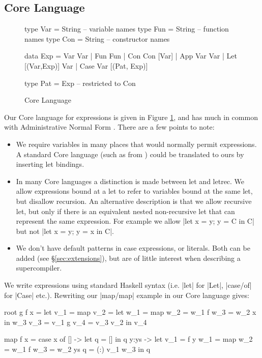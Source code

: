 \documentclass[draft]{sigplanconf}
\begin{document}
\subsection{Core Language}
\label{sec:core}

\begin{figure}
\begin{code}
type Var  = String -- variable names
type Fun  = String -- function names
type Con  = String -- constructor names

data Exp  =  Var Var
          |  Fun Fun
          |  Con Con [Var]
          |  App Var Var
          |  Let [(Var,Exp)] Var
          |  Case Var [(Pat, Exp)]

type Pat = Exp -- restricted to Con
\end{code}
\caption{Core Language}
\label{fig:core}
\end{figure}

Our Core language for expressions is given in Figure \ref{fig:core}, and has much in common with Administrative Normal Form \cite{flanagan:continuations}. There are a few points to note:

\begin{itemize}
\item We require variables in many places that would normally permit expressions. A standard Core language (such as from \citet{ghc_core}) could be translated to ours by inserting let bindings.
\item In many Core languages a distinction is made between let and letrec. We allow expressions bound at a let to refer to variables bound at the same let, but disallow recursion. An alternative description is that we allow recursive let, but only if there is an equivalent nested non-recursive let that can represent the same expression. For example we allow |let x = y; y = C in C| but not |let x = y; y = x in C|.
\item We don't have default patterns in case expressions, or literals. Both can be added (see \S\ref{sec:extensions}), but are of little interest when describing a supercompiler.
\end{itemize}

We write expressions using standard Haskell syntax (i.e. |let| for |Let|, |case/of| for |Case| etc.). Rewriting our |map/map| example in our Core language gives:

\begin{code}
root g f x =  let  v_1 =  map
                   v_2 =  let  w_1 = map
                               w_2 = w_1 f
                               w_3 = w_2 x
                          in   w_3
                   v_3 =  v_1 g
                   v_4 =  v_3 v_2
              in   v_4

map f x = case x of
    [] ->   let  q = []
            in   q
    y:ys -> let  v_1 = f y
                 w_1 = map
                 w_2 = w_1 f
                 w_3 = w_2 ys
                 q = (:) v_1 w_3
            in   q
\end{code}
\end{document}
